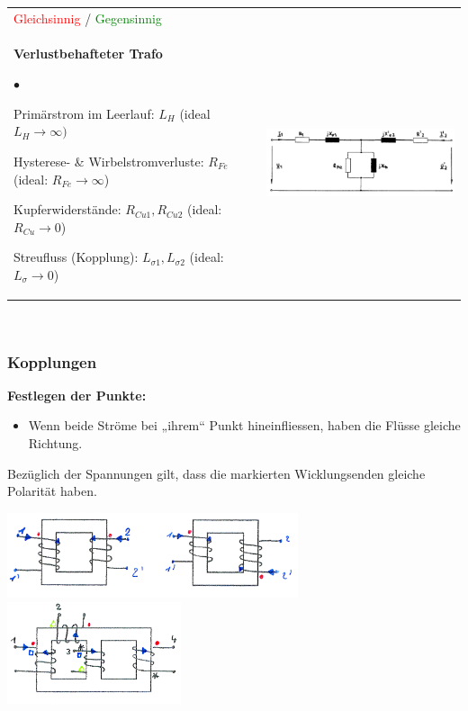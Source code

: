 \begin{tabular}{ll}
{      		\small{\textcolor{red}{Gleichsinnig} / \textcolor{green}{Gegensinnig}}} \\
	  		
  	\parbox{9.7cm}{
      		\textbf{Verlustbehafteter Trafo}
      		\begin{list}{$\bullet$}{\setlength{\itemsep}{0cm} \setlength{\parsep}{0cm} \setlength{\topsep}{0cm}} 
              \item Primärstrom im Leerlauf: $L_H$
	          	(ideal $L_H \rightarrow \infty)$
	          \item Hysterese- \& Wirbelstromverluste: $R_{Fe}$
	          	(ideal: $R_{Fe}
	          \rightarrow \infty$) 
	          \item Kupferwiderstände: $R_{Cu1}, R_{Cu2}$
	          	(ideal: $R_{Cu}
	          \rightarrow 0$)
	          \item Streufluss (Kopplung): $L_{\sigma1}, L_{\sigma2}$
	          	(ideal: $L_{\sigma} \rightarrow 0$)
            \end{list}
      		}
  		& \parbox{8.8cm}{
  			  		\includegraphics[width=8.8cm]{./images/trafo-verluste.png}}
   	\end{tabular}\\[-0.5cm]
   	\renewcommand{\arraystretch}{\arraystretchOriginal}	  
   	
   	\subsubsection{Kopplungen}
   	\begin{minipage}[b]{6cm}
   		\textbf{Festlegen der Punkte:}
   		\begin{itemize}
   			\item Wenn beide Ströme bei „ihrem“ Punkt hineinfliessen, haben die Flüsse gleiche Richtung.
   		\end{itemize}
		Bezüglich der Spannungen gilt, dass die markierten Wicklungsenden gleiche Polarität haben.
   	\end{minipage}
   		\includegraphics[height = 2.5cm]{./images/trafo-kopplungen}
   		\includegraphics[height = 3cm]{./images/trafo-kopplung-mittelschenkel}
   